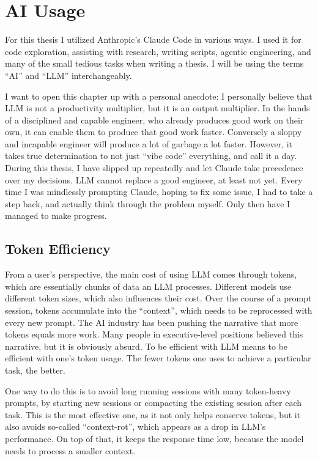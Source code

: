 \chapter{AI Usage}
\label{sec:ai-usage}

For this thesis I utilized Anthropic's Claude Code in various ways.
I used it for code exploration, assisting with research, writing scripts, agentic engineering, and many of the small tedious tasks when writing a thesis.
I will be using the terms ``AI'' and ``LLM'' interchangeably.

I want to open this chapter up with a personal anecdote:
I personally believe that LLM is not a productivity multiplier, but it is an output multiplier.
In the hands of a disciplined and capable engineer, who already produces good work on their own, it can enable them to produce that good work faster.
Conversely a sloppy and incapable engineer will produce a lot of garbage a lot faster.
However, it takes true determination to not just ``vibe code'' everything, and call it a day.
During this thesis, I have slipped up repeatedly and let Claude take precedence over my decisions.
LLM cannot replace a good engineer, at least not yet.
Every time I was mindlessly prompting Claude, hoping to fix some issue, I had to take a step back, and actually think through the problem myself.
Only then have I managed to make progress.

\section{Token Efficiency}

From a user's perspective, the main cost of using LLM comes through tokens, which are essentially chunks of data an LLM processes.
Different models use different token sizes, which also influences their cost.
Over the course of a prompt session, tokens accumulate into the ``context'', which needs to be reprocessed with every new prompt.
The AI industry has been pushing the narrative that more tokens equals more work. %
Many people in executive-level positions believed this narrative, but it is obviously absurd.
To be efficient with LLM means to be efficient with one's token usage.
The fewer tokens one uses to achieve a particular task, the better.

One way to do this is to avoid long running sessions with many token-heavy prompts, by starting new sessions or compacting the existing session after each task.
This is the most effective one, as it not only helps conserve tokens, but it also avoids so-called ``context-rot'', which appears as a drop in LLM's performance.
On top of that, it keeps the response time low, because the model needs to process a smaller context.

